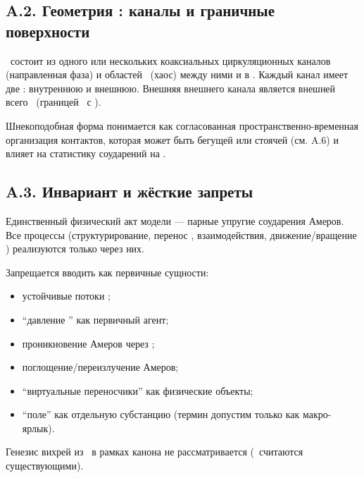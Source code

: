 \subsection{A.2. Геометрия \EVO: каналы и граничные поверхности}

\begin{definition}
\EVO\ состоит из одного или нескольких коаксиальных циркуляционных каналов (направленная фаза)
и областей \NE\ (хаос) между ними и в \NY.
Каждый канал имеет две \GP: внутреннюю и внешнюю.
Внешняя \GP внешнего канала является внешней \GP всего \EVO\ (границей \EVO\ с \SE).
\end{definition}

\begin{remark}
Шнекоподобная форма \GP понимается как согласованная пространственно-временная организация контактов,
которая может быть бегущей или стоячей (см. A.6) и влияет на статистику соударений на \GP.
\end{remark}

\subsection{A.3. Инвариант и жёсткие запреты}

\begin{axiom}
Единственный физический акт модели — парные упругие соударения Амеров.
Все процессы (структурирование, перенос \VR, взаимодействия, движение/вращение \EVO) реализуются только через них.
\end{axiom}

\begin{axiom}
Запрещается вводить как первичные сущности:
\begin{itemize}
\item устойчивые потоки \SE;
\item ``давление \SE'' как первичный агент;
\item проникновение Амеров через \GP;
\item поглощение/переизлучение Амеров;
\item ``виртуальные переносчики'' как физические объекты;
\item ``поле'' как отдельную субстанцию (термин допустим только как макро-ярлык).
\end{itemize}
Генезис вихрей из \SE\ в рамках канона не рассматривается (\EVO\ считаются существующими).
\end{axiom}

